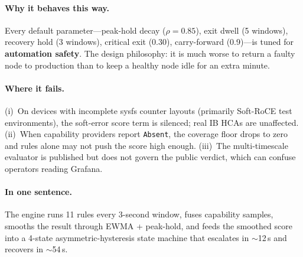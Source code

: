 \documentclass[11pt]{article}
\begin{document}
\paragraph{Why it behaves this way.}
Every default parameter---peak-hold decay ($\rho = 0.85$), exit dwell (5
windows), recovery hold (3 windows), critical exit (0.30), carry-forward
(0.9)---is tuned for \textbf{automation safety}. The design philosophy: it
is much worse to return a faulty node to production than to keep a healthy
node idle for an extra minute.

\paragraph{Where it fails.}
(i)~On devices with incomplete sysfs counter layouts (primarily Soft-RoCE test
environments), the soft-error score term is silenced; real IB HCAs are
unaffected. (ii)~When capability providers report \texttt{Absent}, the
coverage floor drops to zero and rules alone may not push the score high
enough. (iii)~The multi-timescale evaluator is published but does not govern
the public verdict, which can confuse operators reading Grafana.

\paragraph{In one sentence.}
The engine runs 11 rules every 3-second window, fuses capability samples,
smooths the result through EWMA + peak-hold, and feeds the smoothed score
into a 4-state asymmetric-hysteresis state machine that escalates in
$\sim$12\,s and recovers in $\sim$54\,s.
\end{document}
